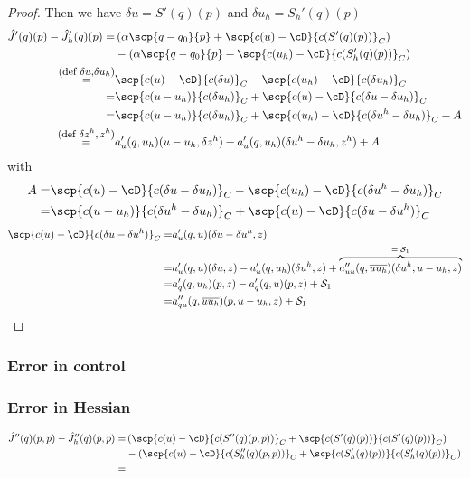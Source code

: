 %
\begin{proof}

Then we have $\delta u = S'(q)(p)$ and $\delta u_h = S_h'(q)(p)$
%
\begin{align*}
\hat J'(q)(p) - \hat J_h'(q)(p) =& \left( \alpha\scp{q-q_0}{p} + \scp{c(u)-\cD}{c(S'(q)(p))}_C\right)\\ 
&- \left( \alpha\scp{q-q_0}{p} + \scp{c(u_h)-\cD}{c(S_h'(q)(p))}_C\right)\\ 
\stackrel{\mbox{\small(def $\delta u$,$\delta u_h$)}}{=}&\scp{c(u)-\cD}{c(\delta u)}_C - \scp{c(u_h)-\cD}{c(\delta u_h)}_C\\
\stackrel{\mbox{}}{=}& \scp{c(u-u_h)}{c(\delta u_h)}_C + \scp{c(u)-\cD}{c(\delta u-\delta u_h)}_C\\
\stackrel{\mbox{}}{=}& \scp{c(u-u_h)}{c(\delta u_h)}_C + \scp{c(u_h)-\cD}{c(\delta u^h-\delta u_h)}_C
+ A\\
\stackrel{\mbox{\small(def $\delta z^h,z^h$)}}{=}& a'_u(q,u_h)(u-u_h,\delta z^{h}) + a'_u(q,u_h)(\delta u^h-\delta u_h,z^h) + A
\end{align*}
%
with
%
%
\begin{align*}
A =& \scp{c(u)-\cD}{c(\delta u-\delta u_h)}_C - \scp{c(u_h)-\cD}{c(\delta u^h-\delta u_h)}_C\\
=& \scp{c(u-u_h)}{c(\delta u^h-\delta u_h)}_C + \scp{c(u)-\cD}{c(\delta u-\delta u^h)}_C
\end{align*}
%
%
\begin{align*}
\scp{c(u)-\cD}{c(\delta u-\delta u^h)}_C =& a'_u(q,u)(\delta u-\delta u^h, z)\\
=& a'_u(q,u)(\delta u, z)- a'_u(q,u_h)(\delta u^h, z) + \overbrace{a''_{uu}(q,\overline{u u_h})(\delta u^h, u-u_h,z)}^{=: \mathcal S_1}\\
=& a'_q(q,u_h)(p,z) - a'_q(q,u)(p,z) + \mathcal S_1\\
=& a''_{qu}(q,\overline{u u_h})(p, u-u_h,z)  + \mathcal S_1
\end{align*}
%
\end{proof}
%
%
%
\subsubsection{Error in control}
%
%
%
\subsubsection{Error in Hessian}
%
%
\begin{align*}
\hat J''(q)(p,p) - \hat J_h''(q)(p,p) =& \left( \scp{c(u)-\cD}{c(S''(q)(p,p))}_C + \scp{c(S'(q)(p))}{c(S'(q)(p))}_C\right)\\ 
&- \left( \scp{c(u)-\cD}{c(S_h''(q)(p,p))}_C + \scp{c(S_h'(q)(p))}{c(S_h'(q)(p))}_C\right)\\ 
=&
\end{align*}
%
%
